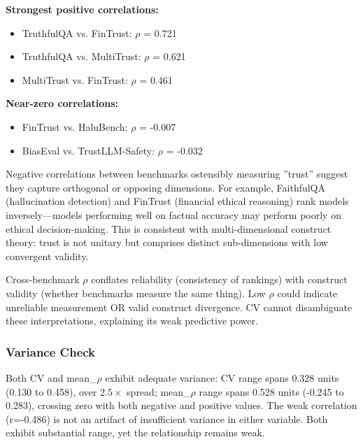 \textbf{Strongest positive correlations:}
\begin{itemize}
\item TruthfulQA vs. FinTrust: $\rho$ = 0.721
\item TruthfulQA vs. MultiTrust: $\rho$ = 0.621
\item MultiTrust vs. FinTrust: $\rho$ = 0.461
\end{itemize}

\textbf{Near-zero correlations:}
\begin{itemize}
\item FinTrust vs. HaluBench: $\rho$ = -0.007
\item BiasEval vs. TrustLLM-Safety: $\rho$ = -0.032
\end{itemize}

Negative correlations between benchmarks ostensibly measuring ''trust'' suggest they capture orthogonal or opposing dimensions. For example, FaithfulQA (hallucination detection) and FinTrust (financial ethical reasoning) rank models inversely---models performing well on factual accuracy may perform poorly on ethical decision-making. This is consistent with multi-dimensional construct theory: trust is not unitary but comprises distinct sub-dimensions with low convergent validity.

Cross-benchmark $\rho$ conflates reliability (consistency of rankings) with construct validity (whether benchmarks measure the same thing). Low $\rho$ could indicate unreliable measurement OR valid construct divergence. CV cannot disambiguate these interpretations, explaining its weak predictive power.

\subsubsection{Variance Check}

Both CV and mean\_$\rho$ exhibit adequate variance: CV range spans 0.328 units (0.130 to 0.458), over 2.$5\times$ spread; mean\_$\rho$ range spans 0.528 units (-0.245 to 0.283), crossing zero with both negative and positive values. The weak correlation (r=-0.486) is not an artifact of insufficient variance in either variable. Both exhibit substantial range, yet the relationship remains weak.
